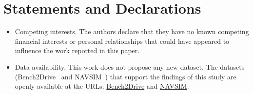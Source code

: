 \documentclass[twocolumn]{template}
\theoremstyle{thmstyleone}%
\theoremstyle{thmstyletwo}%
\theoremstyle{thmstylethree}%
\begin{document}

\section*{Statements and Declarations}


\begin{itemize}
\item Competing interests.
The authors declare that they have no known competing financial interests or personal relationships that could have appeared to influence the work reported in this paper.
\item Data availability.
This work does not propose any new dataset. The datasets (Bench2Drive~\cite{Bench2drive} and NAVSIM~\cite{Navsim}) that support the findings of this study are openly available at the URLs: \href {https://github.com/Thinklab-SJTU/Bench2Drive/tree/main}{Bench2Drive} and \href {https://github.com/autonomousvision/navsim}{NAVSIM}.
\end{itemize}





\end{document}
